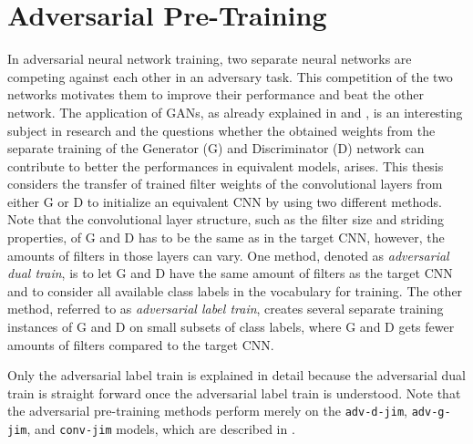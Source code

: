 
\section{Adversarial Pre-Training}\label{sec:nn_adv}
In adversarial neural network training, two separate neural networks are competing against each other in an adversary task.
This competition of the two networks motivates them to improve their performance and beat the other network.
The application of GANs, as already explained in  and , is an interesting subject in research and the questions whether the obtained weights from the separate training of the Generator (G) and Discriminator (D) network can contribute to better the performances in equivalent models, arises.
This thesis considers the transfer of trained filter weights of the convolutional layers from either G or D to initialize an equivalent CNN by using two different methods.
Note that the convolutional layer structure, such as the filter size and striding properties, of G and D has to be the same as in the target CNN, however, the amounts of filters in those layers can vary.
One method, denoted as \emph{adversarial dual train}, is to let G and D have the same amount of filters as the target CNN and to consider all available class labels in the vocabulary for training.
The other method, referred to as \emph{adversarial label train}, creates several separate training instances of G and D on small subsets of class labels, where G and D gets fewer amounts of filters compared to the target CNN.

Only the adversarial label train is explained in detail because the adversarial dual train is straight forward once the adversarial label train is understood.
Note that the adversarial pre-training methods perform merely on the \texttt{adv-d-jim}, \texttt{adv-g-jim}, and \texttt{conv-jim} models, which are described in .



